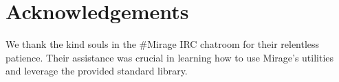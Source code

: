 \documentclass[english,10pt,twocolumn]{article}
\begin{document}
\section{Acknowledgements}
We thank the kind souls in the \#Mirage IRC chatroom for their relentless patience.
Their assistance was crucial in learning how to use Mirage's utilities and leverage the provided standard library.





\end{document}

